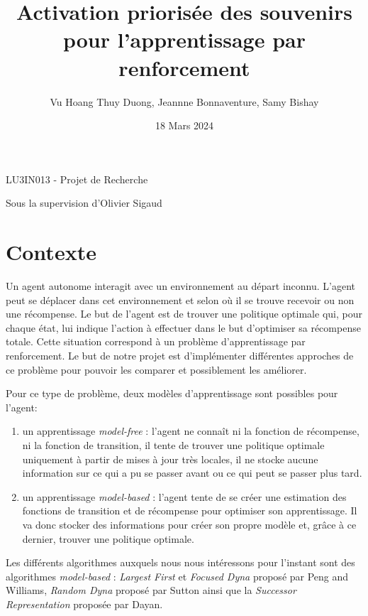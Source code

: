 \documentclass{article}
\title{Activation priorisée des souvenirs pour l'apprentissage par renforcement}
\author{Vu Hoang Thuy Duong, Jeannne Bonnaventure, Samy Bishay}
\date{18 Mars 2024}
\begin{document}
\maketitle

\renewcommand{\thesection}{\arabic{section}} %

\begin{center}
    
    {
    \large LU3IN013 - Projet de Recherche
    
    Sous la supervision d'Olivier Sigaud
    }
\end{center}

\section{Contexte}
Un agent autonome interagit avec un environnement au départ inconnu. L'agent peut se déplacer dans cet environnement et selon où il se trouve recevoir ou non une récompense. Le but de l'agent est de trouver une politique optimale qui, pour chaque état, lui indique l'action à effectuer dans le but d'optimiser sa récompense totale. Cette situation correspond à un problème d'apprentissage par renforcement. Le but de notre projet est d'implémenter différentes approches de ce problème pour pouvoir les comparer et possiblement les améliorer.


Pour ce type de problème, deux modèles d'apprentissage sont possibles pour l'agent: 

\begin{enumerate}
    \item un apprentissage \textit{model-free} : l'agent ne connaît ni la fonction de récompense, ni la fonction de transition, il tente de trouver une politique optimale uniquement à partir de mises à jour très locales, il ne stocke aucune information sur ce qui a pu se passer avant ou ce qui peut se passer plus tard.
    \item un apprentissage \textit{model-based} : l'agent tente de se créer une estimation des fonctions de transition et de récompense pour optimiser son apprentissage. Il va donc stocker des informations pour créer son propre modèle et, grâce à ce dernier, trouver une politique optimale.
\end{enumerate}

Les différents algorithmes auxquels nous nous intéressons pour l'instant sont des algorithmes \textit{model-based} : \textit{Largest First} et \textit{Focused Dyna} proposé par Peng and Williams, 
\textit{Random Dyna} proposé par Sutton ainsi que la \textit{Successor Representation} proposée par Dayan.
\end{document}
